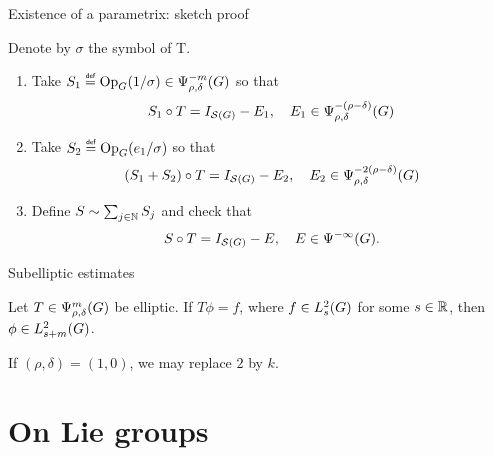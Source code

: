 \documentclass{beamer}
\begin{document}
\begin{frame}
    {Existence of a parametrix: sketch proof}

    \pause
    Denote by $\sigma$ the symbol of T.
    \begin{enumerate}
        \item Take $S_1 \defeq \Op(1 / \sigma) \in \OperatorClass {-m} {\rho, \delta}$ so that
            \begin{align*}
                S_1 \circ T = \Id {\Schwartz \Group} - E_1,
                \quad E_1 \in \OperatorClass {-(\rho - \delta)} {\rho, \delta}
            \end{align*}
            \pause
        \item Take $S_2 \defeq \Op(e_1/\sigma)$ so that
            \begin{align*}
                (S_1 + S_2) \circ T = \Id {\Schwartz \Group} - E_2,
                \quad E_2 \in \OperatorClass {-2(\rho - \delta)} {\rho, \delta}
            \end{align*}
            \pause
        \item Define $S \sim \sum_{j \in \mathbb{N}} S_j$ and check that
            \begin{align*}
                S \circ T = \Id {\Schwartz \Group} - E,
                \quad E \in \SmoothingOperators.
            \end{align*}
    \end{enumerate}
\end{frame}

\begin{frame}
    {Subelliptic estimates}

    \begin{theorem}
        Let $T \in \OperatorClass m {\rho, \delta}$ be elliptic.
        If $T \phi = f$,
        where $f \in \Sobolev s$ for some $s \in \mathbb{R}$,
        then $\phi \in \Sobolev {s + m}$.

        If $(\rho, \delta) = (1, 0)$,
        we may replace $2$ by $k$.
    \end{theorem}
\end{frame}

\section{On Lie groups}

\renewcommand{\Group}{G}
\end{document}

